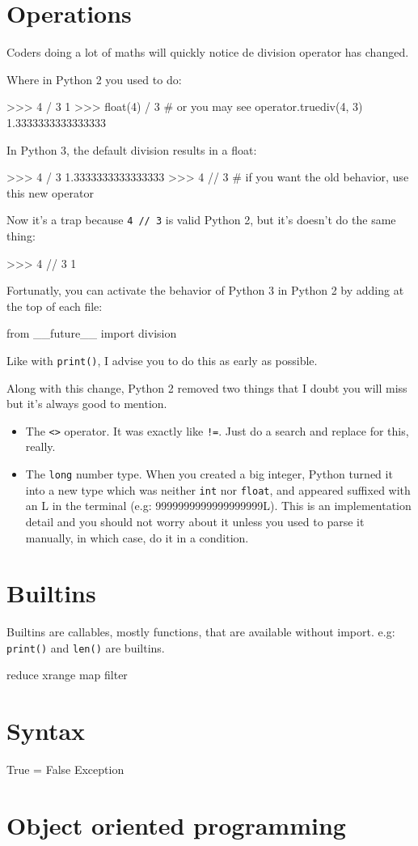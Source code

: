 \section{Operations}

Coders doing a lot of maths will quickly notice de division operator has changed.

Where in Python 2 you used to do:

\begin{py}
>>> 4 / 3
1
>>> float(4) / 3  # or you may see operator.truediv(4, 3)
1.3333333333333333
\end{py}

In Python 3, the default division results in a float:

\begin{py}
>>> 4 / 3
1.3333333333333333
>>> 4 // 3  # if you want the old behavior, use this new operator
\end{py}

Now it's a trap because \lstinline{4 // 3} is valid Python 2, but it's doesn't do the same thing:

\begin{py}
>>> 4 // 3
1
\end{py}

Fortunatly, you can activate the behavior of Python 3 in Python 2 by adding at the top of each file:

\begin{py}
from __future__ import division
\end{py}

Like with \lstinline{print()}, I advise you to do this as early as possible.

Along with this change, Python 2 removed two things that I doubt you will miss but it's always good to mention.

\begin{itemize}
    \item The \lstinline{<>} operator. It was exactly like \lstinline{!=}. Just do a search and replace for this, really.
    \item The \lstinline{long} number type. When you created a big integer, Python turned it into a new type which was neither \lstinline{int} nor \lstinline{float}, and appeared suffixed with an L in the terminal (e.g: 9999999999999999999L). This is an implementation detail and you should not worry about it unless you used to parse it manually, in which case, do it in a condition.
\end{itemize}


\section{Builtins}

Builtins are callables, mostly functions, that are available without import. e.g: \lstinline{print()} and \lstinline{len()} are builtins.

reduce
xrange
map
filter

\section{Syntax}

True = False
Exception

\section{Object oriented programming}

